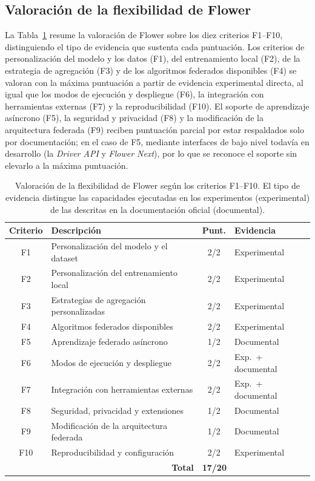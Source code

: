 \subsection{Valoración de la flexibilidad de Flower}\label{subsec:flex-flower-score}

La Tabla~\ref{tab:flex-flower-score} resume la valoración de Flower sobre los diez
criterios F1--F10, distinguiendo el tipo de evidencia que sustenta cada
puntuación. Los criterios de personalización del modelo y los datos (F1), del
entrenamiento local (F2), de la estrategia de agregación (F3) y de los algoritmos
federados disponibles (F4) se valoran con la máxima puntuación a partir de
evidencia experimental directa, al igual que los modos de ejecución y despliegue
(F6), la integración con herramientas externas (F7) y la reproducibilidad (F10).
El soporte de aprendizaje asíncrono (F5), la seguridad y privacidad (F8) y la
modificación de la arquitectura federada (F9) reciben puntuación parcial por estar
respaldados solo por documentación; en el caso de F5, mediante interfaces de bajo
nivel todavía en desarrollo (la \textit{Driver API} y \textit{Flower Next}), por lo
que se reconoce el soporte sin elevarlo a la máxima puntuación.

\begin{table}[htbp]
  \centering
  \caption{Valoración de la flexibilidad de Flower según los criterios F1--F10.
  El tipo de evidencia distingue las capacidades ejecutadas en los experimentos
  (experimental) de las descritas en la documentación oficial (documental).}
  \label{tab:flex-flower-score}
  \begin{tabular}{clcl}
    \toprule
    \textbf{Criterio} & \textbf{Descripción} & \textbf{Punt.} & \textbf{Evidencia} \\
    \midrule
    F1  & Personalización del modelo y el dataset      & 2/2 & Experimental \\
    F2  & Personalización del entrenamiento local      & 2/2 & Experimental \\
    F3  & Estrategias de agregación personalizadas     & 2/2 & Experimental \\
    F4  & Algoritmos federados disponibles             & 2/2 & Experimental \\
    F5  & Aprendizaje federado asíncrono               & 1/2 & Documental \\
    F6  & Modos de ejecución y despliegue              & 2/2 & Exp.\ + documental \\
    F7  & Integración con herramientas externas        & 2/2 & Exp.\ + documental \\
    F8  & Seguridad, privacidad y extensiones          & 1/2 & Documental \\
    F9  & Modificación de la arquitectura federada     & 1/2 & Documental \\
    F10 & Reproducibilidad y configuración             & 2/2 & Experimental \\
    \midrule
    \multicolumn{2}{r}{\textbf{Total}} & \multicolumn{2}{l}{\textbf{17/20}} \\
    \bottomrule
  \end{tabular}
\end{table}


